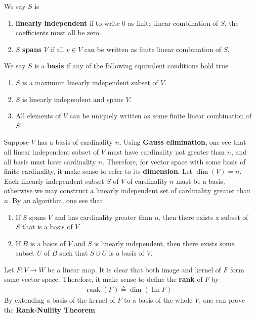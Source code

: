 \documentclass{report}
\begin{document}
\begin{mdframed}
We say  $S$ is 
\begin{enumerate}[label=(\alph*)]
  \item \textbf{linearly independent} if to write $0$ as finite linear combination of  $S$, the coefficients must all be zero.
  \item  $S$  \textbf{spans $V$} if all $v\in V$ can be written as finite linear combination of $S$. 
\end{enumerate}
We say $S$ is a \textbf{basis} if any of the following equivalent conditions hold true 
\begin{enumerate}[label=(\alph*)]
  \item $S$ is a maximum linearly independent subset of  $V$.  
  \item $S$ is linearly independent and spans $V$.  
  \item All elements of $V$ can be uniquely written as some finite linear combination of  $S$. 
\end{enumerate}
Suppose $V$ has a basis  of cardinality $n$. Using \textbf{Gauss elimination}, one see that all linear independent subset of $V$ must have cardinality not greater than $n$, and all basis must have cardinality $n$. Therefore, for vector space with some basis of finite cardinality, it make sense to refer to its \textbf{dimension}. Let $\operatorname{dim}(V)=n$. Each linearly independent subset $S$ of  $V$ of cardinality  $n$ must be a basis, otherwise we may construct a linearly independent set of cardinality greater than  $n$. By an algorithm, one see that 
\begin{enumerate}[label=(\alph*)]
  \item If $S$ spans  $V$ and has cardinality greater than  $n$, then there exists a subset of $S$ that is a basis of $V$.  
  \item If $B$ is a basis of  $V$ and  $S$ is linearly independent, then there exists some subset  $U$ of $B$ such that  $S \cup  U$ is a basis of $V$.   
\end{enumerate}
Let $F:V\rightarrow W$ be a linear map. It is clear that  both image and kernel of $F$ form some vector space. Therefore, it make sense to define the \textbf{rank} of $F$ by 
 \begin{align*}
\operatorname{rank}(F)\triangleq \operatorname{dim} (\operatorname{Im}F)
\end{align*}
By extending a basis of the kernel of $F$ to a basis of the whole  $V$, one can prove the  \textbf{Rank-Nullity Theorem} 
\begin{align*}

\end{align*}
\end{mdframed}
\end{document}
